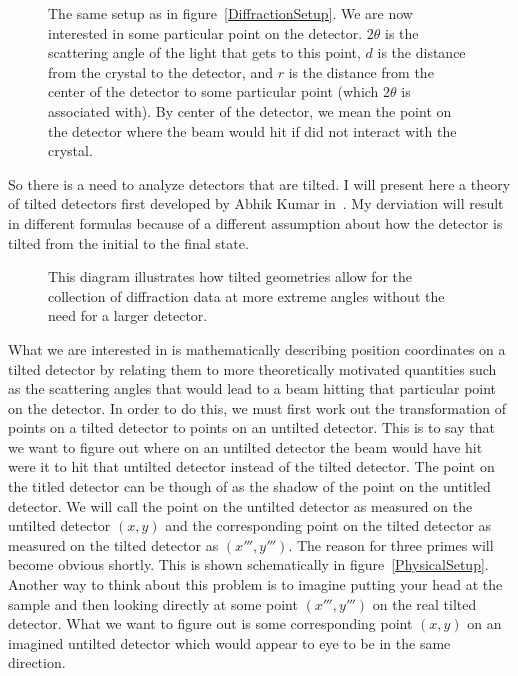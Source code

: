 \begin{SCfigure}[1][htb]
    \centering
    
    \caption{The same setup as in figure~\ref{DiffractionSetup}. 
    We are now interested in some particular point on the 
    detector. $2\theta$ is the scattering angle of the light
    that gets to this point, $d$ is the distance 
    from the crystal to the detector, and $r$ is the distance 
    from the center of the detector to some particular point 
    (which $2\theta$ is associated with). By center 
    of the detector, we mean the point on the detector where 
    the beam would hit if did not interact with the crystal.}
    \label{MeasureAngleFlatDetector}
\end{SCfigure}

So there is a need to analyze detectors that are 
tilted. I will present here a theory of tilted detectors 
first developed by Abhik Kumar in~\cite{Kumar05}.
 My derviation will result in 
different formulas because of a different assumption
about how the detector is tilted from the initial to
the final state.

\begin{SCfigure}[1][htb]
    \centering
    
    \caption{This diagram illustrates how tilted geometries 
    allow for the collection of diffraction data at more 
    extreme angles without the need for a larger detector.}
    \label{HigherQValues}
\end{SCfigure}

What we are interested in is mathematically describing 
position coordinates on a tilted detector by relating 
them to more theoretically motivated quantities such as 
the scattering angles that would lead to a beam hitting
that particular point on the detector. 
In order to do this, we must first work
out the transformation of points on a tilted detector
to points on an untilted detector. This is to say
that we want to figure out where on an untilted 
detector the beam would have hit were it to hit
that untilted detector instead of the tilted detector.
The point on the titled detector can be though of
as the shadow of the point on the untitled detector.
We will call the point on the untilted detector
as measured on the untilted detector $(x,y)$ 
and the corresponding point on the tilted detector
as measured on the tilted detector as $(x''',y''')$. 
The reason for three primes will become obvious
shortly. This is shown schematically in 
figure~\ref{PhysicalSetup}. Another way to think
about this problem is to imagine putting your 
head at the sample and then looking directly 
at some point $(x''',y''')$ on the real
tilted detector. What we want to figure out
is some corresponding point $(x,y)$ on an 
imagined untilted 
detector which would appear to eye to be 
in the same direction.

